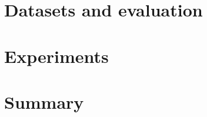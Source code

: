 \documentclass[12pt,a4paper,openany]{book}
\begin{document}
\chapter{Datasets and evaluation}
\chapter{Experiments}
\chapter{Summary}










































\end{document}
